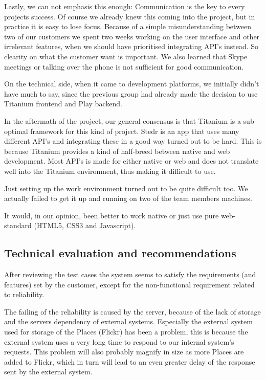 Lastly, we can not emphasis this enough: Communication is the key to every projects success. Of course we already knew this coming into the project, but in practice it is easy to lose focus. Because of a simple misunderstanding between two of our customers we spent two weeks working on the user interface and other irrelevant features, when we should have prioritised integrating API’s instead. So clearity on what the customer want is important. We also learned that Skype meetings or talking over the phone is not sufficient for good communication.

On the technical side, when it came to development platforms, we initially didn't have much to say, since the previous group had already made the decision to use Titanium frontend and Play backend.

In the aftermath of the project, our general consensus is that Titanium is a sub-optimal framework for this kind of project. Stedr is an app that uses many different API's and integrating these in a good way turned out to be hard. This is because Titanium provides a kind of half-breed between native and web development. Most API's is made for either native or web and does not translate well into the Titanium environment, thus making it difficult to use.

Just setting up the work environment turned out to be quite difficult too. We actually failed to get it up and running on two of the team members machines.

It would, in our opinion, been better to work native or just use pure web-standard (HTML5, CSS3 and Javascript).

	\subsection{Technical evaluation and recommendations}

After reviewing the test cases the system seems to satisfy the requirements (and features) set by the customer, except for the non-functional requirement related to reliability.

The failing of the reliability is caused by the server, because of the lack of storage and the servers dependency of external systems. Especially the external system used for storage of the Places (Flickr) has been a problem, this is because the external system uses a very long time to respond to our internal system's requests. This problem will also probably magnify in size as more Places are added to Flickr, which in turn will lead to an even greater delay of the response sent by the external system.

